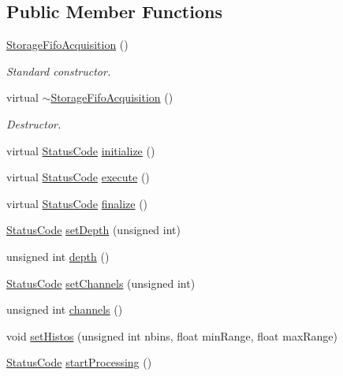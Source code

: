 \subsection*{Public Member Functions}
\begin{DoxyCompactItemize}
\item 
\hyperlink{classStorageFifoAcquisition_a32975d5adfb2fbeeaf18b50be5fb58fe}{StorageFifoAcquisition} ()
\begin{DoxyCompactList}\small\item\em Standard constructor. \item\end{DoxyCompactList}\item 
virtual \hyperlink{classStorageFifoAcquisition_acfa89ab91baa3dbd3a8651992c396cf3}{$\sim$StorageFifoAcquisition} ()
\begin{DoxyCompactList}\small\item\em Destructor. \item\end{DoxyCompactList}\item 
virtual \hyperlink{classStatusCode}{StatusCode} \hyperlink{classStorageFifoAcquisition_a9cf77a05d754282e7737fb439bfa835d}{initialize} ()
\item 
virtual \hyperlink{classStatusCode}{StatusCode} \hyperlink{classStorageFifoAcquisition_a36ffcd2b9bd7ff721c4d0b638b8e4901}{execute} ()
\item 
virtual \hyperlink{classStatusCode}{StatusCode} \hyperlink{classStorageFifoAcquisition_acb6eee350941bc44e2a4cb768b359d4f}{finalize} ()
\item 
\hyperlink{classStatusCode}{StatusCode} \hyperlink{classStorageFifoAcquisition_a34f9ade5de4933552aa7bcfdf6a9c264}{setDepth} (unsigned int)
\item 
unsigned int \hyperlink{classStorageFifoAcquisition_a2d549502ced65dc2e02500d2216ad23b}{depth} ()
\item 
\hyperlink{classStatusCode}{StatusCode} \hyperlink{classStorageFifoAcquisition_adc27c0b9e7c3e8b35679bf461258769d}{setChannels} (unsigned int)
\item 
unsigned int \hyperlink{classStorageFifoAcquisition_ab8ff708c3269e56312115df8351bbe24}{channels} ()
\item 
void \hyperlink{classStorageFifoAcquisition_af1482fb0a9e3cd5210902cf96b3f5313}{setHistos} (unsigned int nbins, float minRange, float maxRange)
\item 
\hyperlink{classStatusCode}{StatusCode} \hyperlink{classProcessus_a09319bde9bed93e290f69b4e04585543}{startProcessing} ()

\end{DoxyCompactItemize}
